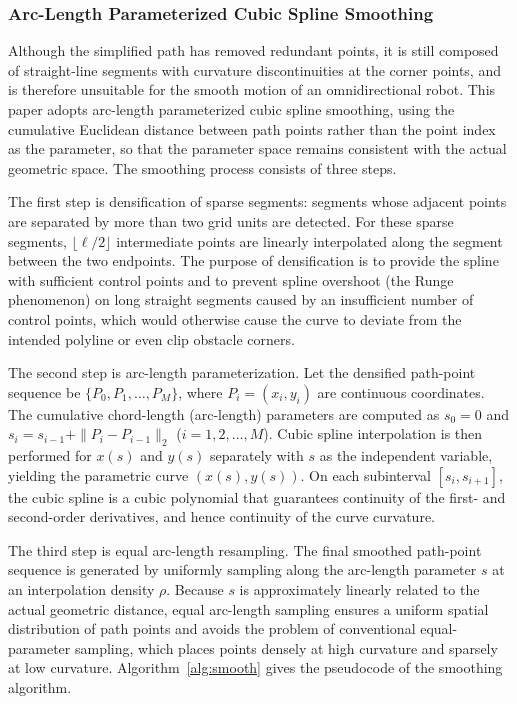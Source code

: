 \subsubsection{Arc-Length Parameterized Cubic Spline Smoothing}

Although the simplified path has removed redundant points, it is still composed of straight-line segments with curvature discontinuities at the corner points, and is therefore unsuitable for the smooth motion of an omnidirectional robot. This paper adopts arc-length parameterized cubic spline smoothing, using the cumulative Euclidean distance between path points rather than the point index as the parameter, so that the parameter space remains consistent with the actual geometric space. The smoothing process consists of three steps.

The first step is densification of sparse segments: segments whose adjacent points are separated by more than two grid units are detected. For these sparse segments, $\lfloor \ell / 2 \rfloor$ intermediate points are linearly interpolated along the segment between the two endpoints. The purpose of densification is to provide the spline with sufficient control points and to prevent spline overshoot (the Runge phenomenon) on long straight segments caused by an insufficient number of control points, which would otherwise cause the curve to deviate from the intended polyline or even clip obstacle corners.

The second step is arc-length parameterization. Let the densified path-point sequence be $\{P_0, P_1, \ldots, P_M\}$, where $P_i = (x_i, y_i)$ are continuous coordinates. The cumulative chord-length (arc-length) parameters are computed as $s_0 = 0$ and $s_i = s_{i-1} + \|P_i - P_{i-1}\|_2$ ($i = 1, 2, \ldots, M$). Cubic spline interpolation is then performed for $x(s)$ and $y(s)$ separately with $s$ as the independent variable, yielding the parametric curve $(x(s), y(s))$. On each subinterval $[s_i, s_{i+1}]$, the cubic spline is a cubic polynomial that guarantees continuity of the first- and second-order derivatives, and hence continuity of the curve curvature.

The third step is equal arc-length resampling. The final smoothed path-point sequence is generated by uniformly sampling along the arc-length parameter $s$ at an interpolation density $\rho$. Because $s$ is approximately linearly related to the actual geometric distance, equal arc-length sampling ensures a uniform spatial distribution of path points and avoids the problem of conventional equal-parameter sampling, which places points densely at high curvature and sparsely at low curvature. Algorithm~\textcolor{blue}{\ref{alg:smooth}} gives the pseudocode of the smoothing algorithm.


